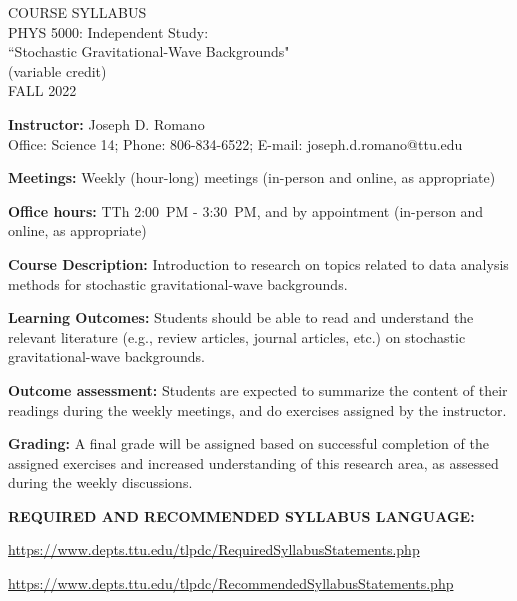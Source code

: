 \documentclass[11pt]{NSF}
\begin{document}
\begin{center}
COURSE SYLLABUS\\
PHYS 5000: Independent Study:\\ 
``Stochastic Gravitational-Wave Backgrounds"\\
(variable credit)\\
FALL 2022\\
\end{center}

{\bf Instructor:}
Joseph D. Romano\\
Office: Science 14; Phone: 806-834-6522; E-mail: joseph.d.romano@ttu.edu

{\bf Meetings:}
Weekly (hour-long) meetings (in-person and online, as appropriate)

{\bf Office hours:}
TTh 2:00~PM - 3:30~PM, and by appointment (in-person and online, as appropriate)

{\bf Course Description:}
Introduction to research on topics related to data analysis
methods for stochastic gravitational-wave backgrounds.

{\bf Learning Outcomes:}
Students should be able to read and understand the relevant 
literature (e.g., review articles, journal articles, etc.) 
on stochastic gravitational-wave backgrounds.

{\bf Outcome assessment:} 
Students are expected to summarize the content of their readings
during the weekly meetings, and do exercises assigned by the
instructor.

{\bf Grading:}
A final grade will be assigned based on successful completion of 
the assigned exercises and increased understanding of this research 
area, as assessed during the weekly discussions.

{\bf REQUIRED AND RECOMMENDED SYLLABUS LANGUAGE:}

\url{https://www.depts.ttu.edu/tlpdc/RequiredSyllabusStatements.php}

\url{https://www.depts.ttu.edu/tlpdc/RecommendedSyllabusStatements.php}
\end{document}
